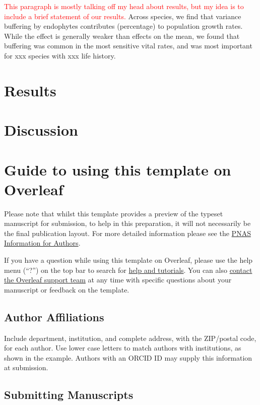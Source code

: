 \documentclass[9pt,twocolumn,twoside,lineno]{pnas-new}
\begin{document}
\textcolor{red}{This paragraph is mostly talking off my head about results, but my idea is to include a brief statement of our results.}
Across species, we find that variance buffering by endophytes contributes (percentage) to population growth rates. While the effect is generally weaker than effects on the mean, we found that buffering was common in the most sensitive vital rates, and was most important for xxx species with xxx life history.





\section*{Results}

\section*{Discussion}

\section*{Guide to using this template on Overleaf}

Please note that whilst this template provides a preview of the typeset manuscript for submission, to help in this preparation, it will not necessarily be the final publication layout. For more detailed information please see the \href{http://www.pnas.org/site/authors/format.xhtml}{PNAS Information for Authors}.

If you have a question while using this template on Overleaf, please use the help menu (``?'') on the top bar to search for \href{https://www.overleaf.com/help}{help and tutorials}. You can also \href{https://www.overleaf.com/contact}{contact the Overleaf support team} at any time with specific questions about your manuscript or feedback on the template.

\subsection*{Author Affiliations}

Include department, institution, and complete address, with the ZIP/postal code, for each author. Use lower case letters to match authors with institutions, as shown in the example. Authors with an ORCID ID may supply this information at submission.

\subsection*{Submitting Manuscripts}
\end{document}
